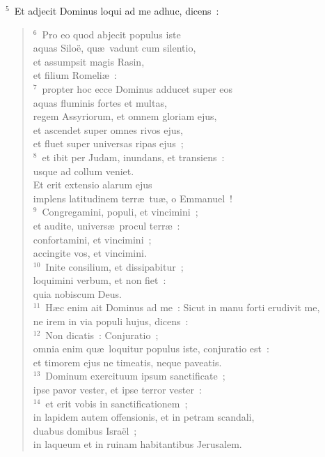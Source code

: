 ${}^{5}$~Et adjecit Dominus loqui ad me adhuc, dicens~:
\begin{verse}${}^{6}$~Pro eo quod abjecit populus iste\\ aquas Silo\"e, qu\ae\ vadunt cum silentio,\\ et assumpsit magis Rasin,\\ et filium Romeli\ae~:\\
${}^{7}$~propter hoc ecce Dominus adducet super eos\\ aquas fluminis fortes et multas,\\ regem Assyriorum, et omnem gloriam ejus,\\ et ascendet super omnes rivos ejus,\\ et fluet super universas ripas ejus~;\\
${}^{8}$~et ibit per Judam, inundans, et transiens~:\\ usque ad collum veniet.\\ Et erit extensio alarum ejus\\ implens latitudinem terr\ae\ tu\ae , o Emmanuel~!\\
${}^{9}$~Congregamini, populi, et vincimini~;\\ et audite, univers\ae\ procul terr\ae~:\\ confortamini, et vincimini~;\\ accingite vos, et vincimini.\\
${}^{10}$~Inite consilium, et dissipabitur~;\\ loquimini verbum, et non fiet~:\\ quia nobiscum Deus.\\
${}^{11}$~H\ae c enim ait Dominus ad me~: Sicut in manu forti erudivit me,\\ ne irem in via populi hujus, dicens~:\\
${}^{12}$~Non dicatis~: Conjuratio~;\\ omnia enim qu\ae\ loquitur populus iste, conjuratio est~:\\ et timorem ejus ne timeatis, neque paveatis.\\
${}^{13}$~Dominum exercituum ipsum sanctificate~;\\ ipse pavor vester, et ipse terror vester~:\\
${}^{14}$~et erit vobis in sanctificationem~;\\ in lapidem autem offensionis, et in petram scandali,\\ duabus domibus Isra\"el~;\\ in laqueum et in ruinam habitantibus Jerusalem.\\

\end{verse}
